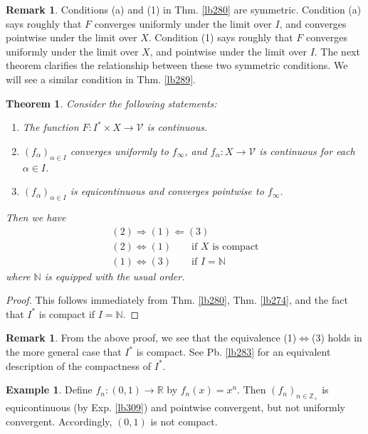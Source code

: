 \documentclass[12pt,b5paper,notitlepage]{article}
\theoremstyle{definition}
\newtheorem{eg}[df]{Example}
\newtheorem{rem}[df]{Remark}
\theoremstyle{plain}
\newtheorem{thm}[df]{Theorem}
\newcommand{\mc}{\mathcal}
\newcommand{\Nbb}{\mathbb N}
\newcommand{\Zbb}{\mathbb Z}
\newcommand{\Rbb}{\mathbb R}
\numberwithin{equation}{section}
\begin{document}
\begin{rem}\label{lb340}
Conditions (a) and (1) in Thm. \ref{lb280} are symmetric. Condition (a) says roughly that $F$ converges uniformly under the limit over $I$, and converges pointwise under the limit over $X$. Condition (1) says roughly that $F$ converges uniformly under the limit over $X$, and pointwise under the limit over $I$. The next theorem clarifies the relationship between these two symmetric conditions. We will see a similar condition in Thm. \ref{lb289}.
\end{rem}



\begin{thm}\label{lb277}
Consider the following statements:
\begin{enumerate}
\item[(1)] The function $F:I^*\times X\rightarrow\mc V$ is continuous.
\item[(2)] $(f_\alpha)_{\alpha\in I}$ converges uniformly to $f_\infty$, and $f_\alpha:X\rightarrow\mc V$ is continuous for each $\alpha\in I$.
\item[(3)] $(f_\alpha)_{\alpha\in I}$ is equicontinuous and converges pointwise to $f_\infty$.
\end{enumerate}
Then we have
\begin{gather*}
(2)\Longrightarrow(1)\Longleftarrow (3)\\
(2)\Longleftrightarrow(1)\qquad \text{if $X$ is compact}\\
(1)\Longleftrightarrow (3) \qquad \text{if }I=\Nbb
\end{gather*}
where $\Nbb$ is equipped with the usual order.
\end{thm}






\begin{proof}
This follows immediately from Thm. \ref{lb280}, Thm. \ref{lb274}, and the fact that $I^*$ is compact if $I=\Nbb$. 
\end{proof}

\begin{rem}
From the above proof, we see that the equivalence (1)$\Leftrightarrow$(3) holds in the more general case that $I^*$ is compact. See Pb. \ref{lb283} for an equivalent description of the compactness of $I^*$.
\end{rem}


\begin{eg}
Define $f_n:(0,1)\rightarrow\Rbb$ by $f_n(x)=x^n$. Then $(f_n)_{n\in\Zbb_+}$ is equicontinuous (by Exp. \ref{lb309}) and pointwise convergent, but not uniformly convergent. Accordingly, $(0,1)$ is not compact. 
\end{eg}
\end{document}
